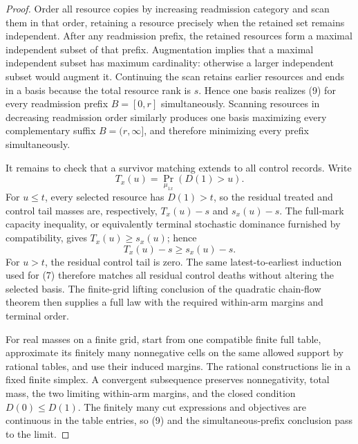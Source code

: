 \documentclass{article}
\begin{document}
\begin{proof}
Order all resource copies by increasing readmission category and scan them in that order, retaining a resource precisely when the retained set remains independent.  After any readmission prefix, the retained resources form a maximal independent subset of that prefix.  Augmentation implies that a maximal independent subset has maximum cardinality: otherwise a larger independent subset would augment it.  Continuing the scan retains earlier resources and ends in a basis because the total resource rank is \(s\).  Hence one basis realizes (9) for every readmission prefix \(B=[0,r]\) simultaneously.  Scanning resources in decreasing readmission order similarly produces one basis maximizing every complementary suffix \(B=(r,\infty]\), and therefore minimizing every prefix simultaneously.

It remains to check that a survivor matching extends to all control records.  Write
\[
T_x(u)=\Pr_{\mu_{1x}}(D(1)>u).
\]
For \(u\leq t\), every selected resource has \(D(1)>t\), so the residual treated and control tail masses are, respectively, \(T_x(u)-s\) and \(s_x(u)-s\).  The full-mark capacity inequality, or equivalently terminal stochastic dominance furnished by compatibility, gives \(T_x(u)\geq s_x(u)\); hence
\[
T_x(u)-s\geq s_x(u)-s. \tag{10}
\]
For \(u>t\), the residual control tail is zero.  The same latest-to-earliest induction used for (7) therefore matches all residual control deaths without altering the selected basis.  The finite-grid lifting conclusion of the quadratic chain-flow theorem then supplies a full law with the required within-arm margins and terminal order.

For real masses on a finite grid, start from one compatible finite full table, approximate its finitely many nonnegative cells on the same allowed support by rational tables, and use their induced margins.  The rational constructions lie in a fixed finite simplex.  A convergent subsequence preserves nonnegativity, total mass, the two limiting within-arm margins, and the closed condition \(D(0)\leq D(1)\).  The finitely many cut expressions and objectives are continuous in the table entries, so (9) and the simultaneous-prefix conclusion pass to the limit.


\end{proof}
\end{document}
